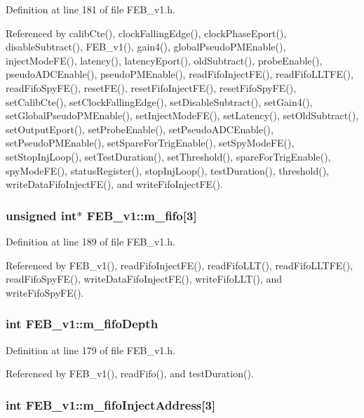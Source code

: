 Definition at line 181 of file FEB\_\-v1.h.

Referenced by calibCte(), clockFallingEdge(), clockPhaseEport(), disableSubtract(), FEB\_\-v1(), gain4(), globalPseudoPMEnable(), injectModeFE(), latency(), latencyEport(), oldSubtract(), probeEnable(), pseudoADCEnable(), pseudoPMEnable(), readFifoInjectFE(), readFifoLLTFE(), readFifoSpyFE(), resetFE(), resetFifoInjectFE(), resetFifoSpyFE(), setCalibCte(), setClockFallingEdge(), setDisableSubtract(), setGain4(), setGlobalPseudoPMEnable(), setInjectModeFE(), setLatency(), setOldSubtract(), setOutputEport(), setProbeEnable(), setPseudoADCEnable(), setPseudoPMEnable(), setSpareForTrigEnable(), setSpyModeFE(), setStopInjLoop(), setTestDuration(), setThreshold(), spareForTrigEnable(), spyModeFE(), statusRegister(), stopInjLoop(), testDuration(), threshold(), writeDataFifoInjectFE(), and writeFifoInjectFE().\hypertarget{classFEB__v1_ae5b770f2f5ffb97324862c93e3153985}{
\subsubsection[{m\_\-fifo}]{\setlength{\rightskip}{0pt plus 5cm}unsigned int$\ast$ {\bf FEB\_\-v1::m\_\-fifo}\mbox{[}3\mbox{]}}}
\label{classFEB__v1_ae5b770f2f5ffb97324862c93e3153985}


Definition at line 189 of file FEB\_\-v1.h.

Referenced by FEB\_\-v1(), readFifoInjectFE(), readFifoLLT(), readFifoLLTFE(), readFifoSpyFE(), writeDataFifoInjectFE(), writeFifoLLT(), and writeFifoSpyFE().\hypertarget{classFEB__v1_a30473bcdd8f018ad5dac728f6779df9c}{
\subsubsection[{m\_\-fifoDepth}]{\setlength{\rightskip}{0pt plus 5cm}int {\bf FEB\_\-v1::m\_\-fifoDepth}}}
\label{classFEB__v1_a30473bcdd8f018ad5dac728f6779df9c}


Definition at line 179 of file FEB\_\-v1.h.

Referenced by FEB\_\-v1(), readFifo(), and testDuration().\hypertarget{classFEB__v1_afd035f292061e1823ed64471bb0228ef}{
\subsubsection[{m\_\-fifoInjectAddress}]{\setlength{\rightskip}{0pt plus 5cm}int {\bf FEB\_\-v1::m\_\-fifoInjectAddress}\mbox{[}3\mbox{]}}}
\label{classFEB__v1_afd035f292061e1823ed64471bb0228ef}



